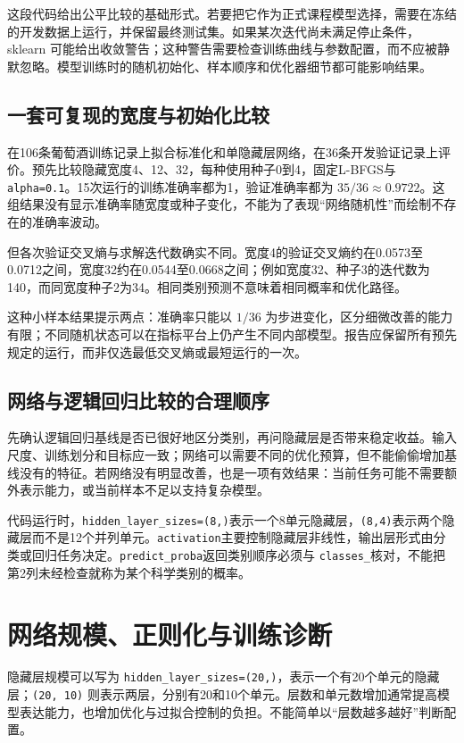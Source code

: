 这段代码给出公平比较的基础形式。若要把它作为正式课程模型选择，需要在冻结的开发数据上运行，并保留最终测试集。如果某次迭代尚未满足停止条件，sklearn 可能给出收敛警告；这种警告需要检查训练曲线与参数配置，而不应被静默忽略。模型训练时的随机初始化、样本顺序和优化器细节都可能影响结果。


\subsection{一套可复现的宽度与初始化比较}
在106条葡萄酒训练记录上拟合标准化和单隐藏层网络，在36条开发验证记录上评价。预先比较隐藏宽度4、12、32，每种使用种子0到4，固定L-BFGS与 \texttt{alpha=0.1}。15次运行的训练准确率都为1，验证准确率都为 $35/36\approx0.9722$。这组结果没有显示准确率随宽度或种子变化，不能为了表现“网络随机性”而绘制不存在的准确率波动。

但各次验证交叉熵与求解迭代数确实不同。宽度4的验证交叉熵约在0.0573至0.0712之间，宽度32约在0.0544至0.0668之间；例如宽度32、种子3的迭代数为140，而同宽度种子2为34。相同类别预测不意味着相同概率和优化路径。

这种小样本结果提示两点：准确率只能以 $1/36$ 为步进变化，区分细微改善的能力有限；不同随机状态可以在指标平台上仍产生不同内部模型。报告应保留所有预先规定的运行，而非仅选最低交叉熵或最短运行的一次。

\subsection{网络与逻辑回归比较的合理顺序}
先确认逻辑回归基线是否已很好地区分类别，再问隐藏层是否带来稳定收益。输入尺度、训练划分和目标应一致；网络可以需要不同的优化预算，但不能偷偷增加基线没有的特征。若网络没有明显改善，也是一项有效结果：当前任务可能不需要额外表示能力，或当前样本不足以支持复杂模型。

代码运行时，\texttt{hidden\_layer\_sizes=(8,)}表示一个8单元隐藏层，\texttt{(8,4)}表示两个隐藏层而不是12个并列单元。\texttt{activation}主要控制隐藏层非线性，输出层形式由分类或回归任务决定。\texttt{predict\_proba}返回类别顺序必须与 \texttt{classes\_}核对，不能把第2列未经检查就称为某个科学类别的概率。

\section{网络规模、正则化与训练诊断}
隐藏层规模可以写为 \texttt{hidden\_layer\_sizes=(20,)}，表示一个有20个单元的隐藏层；\texttt{(20, 10)} 则表示两层，分别有20和10个单元。层数和单元数增加通常提高模型表达能力，也增加优化与过拟合控制的负担。不能简单以“层数越多越好”判断配置。

